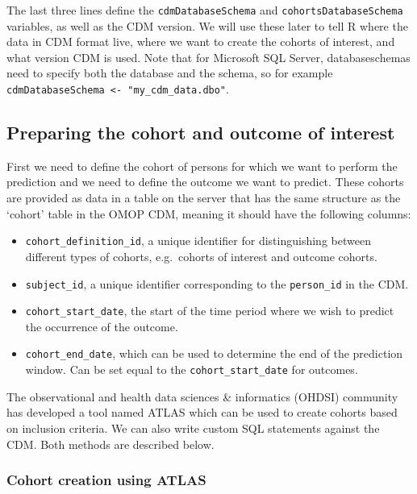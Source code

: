 \documentclass[]{article}
\providecommand{\tightlist}{%
  \setlength{\itemsep}{0pt}\setlength{\parskip}{0pt}}
\begin{document}
The last three lines define the \texttt{cdmDatabaseSchema} and
\texttt{cohortsDatabaseSchema} variables, as well as the CDM version. We
will use these later to tell R where the data in CDM format live, where
we want to create the cohorts of interest, and what version CDM is used.
Note that for Microsoft SQL Server, databaseschemas need to specify both
the database and the schema, so for example
\texttt{cdmDatabaseSchema\ \textless{}-\ "my\_cdm\_data.dbo"}.

\subsection{Preparing the cohort and outcome of
interest}\label{preparing-the-cohort-and-outcome-of-interest}

First we need to define the cohort of persons for which we want to
perform the prediction and we need to define the outcome we want to
predict. These cohorts are provided as data in a table on the server
that has the same structure as the `cohort' table in the OMOP CDM,
meaning it should have the following columns:

\begin{itemize}
\tightlist
\item
  \texttt{cohort\_definition\_id}, a unique identifier for
  distinguishing between different types of cohorts, e.g.~cohorts of
  interest and outcome cohorts.
\item
  \texttt{subject\_id}, a unique identifier corresponding to the
  \texttt{person\_id} in the CDM.
\item
  \texttt{cohort\_start\_date}, the start of the time period where we
  wish to predict the occurrence of the outcome.
\item
  \texttt{cohort\_end\_date}, which can be used to determine the end of
  the prediction window. Can be set equal to the
  \texttt{cohort\_start\_date} for outcomes.
\end{itemize}

The observational and health data sciences \& informatics (OHDSI)
community has developed a tool named ATLAS which can be used to create
cohorts based on inclusion criteria. We can also write custom SQL
statements against the CDM. Both methods are described below.

\subsubsection{Cohort creation using
ATLAS}\label{cohort-creation-using-atlas}
\end{document}
